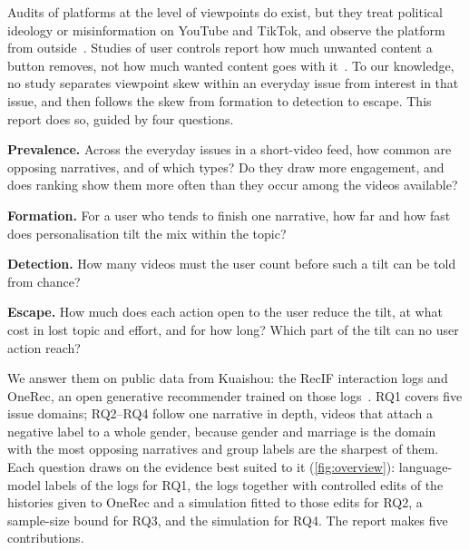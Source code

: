 Audits of platforms at the level of viewpoints do exist, but they treat political ideology or misinformation on YouTube and TikTok, and observe the platform from outside~\citep{haroon2023youtube,hosseinmardi2024bots,pecher2026tiktok}. Studies of user controls report how much unwanted content a button removes, not how much wanted content goes with it~\citep{ricks2022button,liu2024train,kaplan2026foryou}. To our knowledge, no study separates viewpoint skew within an everyday issue from interest in that issue, and then follows the skew from formation to detection to escape. This report does so, guided by four questions.

\begin{rqbox}
\small
\begin{description}[leftmargin=3.2em,style=sameline,itemsep=0.2em,topsep=0pt]
  \item[\RQ{1}] \textbf{Prevalence.} Across the everyday issues in a short-video feed, how common are opposing narratives, and of which types? Do they draw more engagement, and does ranking show them more often than they occur among the videos available?
  \item[\RQ{2}] \textbf{Formation.} For a user who tends to finish one narrative, how far and how fast does personalisation tilt the mix within the topic?
  \item[\RQ{3}] \textbf{Detection.} How many videos must the user count before such a tilt can be told from chance?
  \item[\RQ{4}] \textbf{Escape.} How much does each action open to the user reduce the tilt, at what cost in lost topic and effort, and for how long? Which part of the tilt can no user action reach?
\end{description}
\end{rqbox}

We answer them on public data from Kuaishou: the RecIF interaction logs and OneRec, an open generative recommender trained on those logs~\citep{zhou2025openonerec}. RQ1 covers five issue domains; RQ2--RQ4 follow one narrative in depth, videos that attach a negative label to a whole gender, because gender and marriage is the domain with the most opposing narratives and group labels are the sharpest of them. Each question draws on the evidence best suited to it (\cref{fig:overview}): language-model labels of the logs for RQ1, the logs together with controlled edits of the histories given to OneRec and a simulation fitted to those edits for RQ2, a sample-size bound for RQ3, and the simulation for RQ4. The report makes five contributions.

